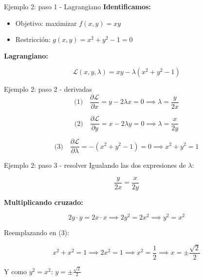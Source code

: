 \documentclass{beamer}
\begin{document}
\begin{frame}{Ejemplo 2: paso 1 - Lagrangiano}
    \small
    \textbf{Identificamos:}
    \begin{itemize}
        \item Objetivo: maximizar $f(x, y) = xy$
        \item Restricción: $g(x, y) = x^2 + y^2 - 1 = 0$
    \end{itemize}

    \vspace{0.8em}

    \textbf{Lagrangiano:}

    \[
    \mathcal{L}(x, y, \lambda) = xy - \lambda(x^2 + y^2 - 1)
    \]
\end{frame}

\begin{frame}{Ejemplo 2: paso 2 - derivadas}
    \small
    \[
    \text{(1)} \quad \frac{\partial \mathcal{L}}{\partial x} = y - 2\lambda x = 0 \implies \lambda = \frac{y}{2x}
    \]

    \[
    \text{(2)} \quad \frac{\partial \mathcal{L}}{\partial y} = x - 2\lambda y = 0 \implies \lambda = \frac{x}{2y}
    \]

    \[
    \text{(3)} \quad \frac{\partial \mathcal{L}}{\partial \lambda} = -(x^2 + y^2 - 1) = 0 \implies x^2 + y^2 = 1
    \]
\end{frame}

\begin{frame}{Ejemplo 2: paso 3 - resolver}
    \small
    Igualando las dos expresiones de $\lambda$:

    \[
    \frac{y}{2x} = \frac{x}{2y}
    \]

    \vspace{0.3em}

    \textbf{Multiplicando cruzado:}

    \[
    2y \cdot y = 2x \cdot x \implies 2y^2 = 2x^2 \implies y^2 = x^2
    \]

    \vspace{0.5em}

    Reemplazando en (3):

    \[
    x^2 + x^2 = 1 \implies 2x^2 = 1 \implies x^2 = \frac{1}{2} \implies x = \pm \frac{\sqrt{2}}{2}
    \]

    \vspace{0.3em}

    Y como $y^2 = x^2$: $y = \pm \frac{\sqrt{2}}{2}$
\end{frame}
\end{document}
